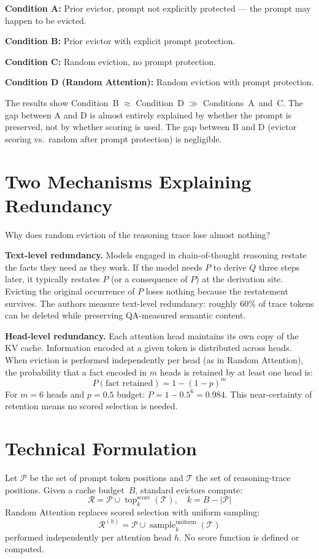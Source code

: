 \documentclass[10pt,twocolumn]{article}
\begin{document}
\textbf{Condition A:} Prior evictor, prompt not explicitly protected
--- the prompt may happen to be evicted.

\textbf{Condition B:} Prior evictor with explicit prompt protection.

\textbf{Condition C:} Random eviction, no prompt protection.

\textbf{Condition D (Random Attention):} Random eviction with prompt
protection.

The results show Condition~B $\approx$ Condition~D $\gg$
Conditions~A~and~C. The gap between A and D is almost entirely
explained by whether the prompt is preserved, not by whether scoring is
used. The gap between B and D (evictor scoring vs.\ random after prompt
protection) is negligible.

\section{Two Mechanisms Explaining Redundancy}

Why does random eviction of the reasoning trace lose almost nothing?

\textbf{Text-level redundancy.} Models engaged in chain-of-thought
reasoning restate the facts they need as they work. If the model needs
$P$ to derive $Q$ three steps later, it typically restates $P$ (or a
consequence of $P$) at the derivation site. Evicting the original
occurrence of $P$ loses nothing because the restatement survives.
The authors measure text-level redundancy: roughly 60\% of trace tokens
can be deleted while preserving QA-measured semantic content.

\textbf{Head-level redundancy.} Each attention head maintains its own
copy of the KV cache. Information encoded at a given token is
distributed across heads. When eviction is performed independently per
head (as in Random Attention), the probability that a fact encoded in
$m$ heads is retained by at least one head is:
\[
  P(\text{fact retained}) = 1 - (1-p)^m
\]
For $m = 6$ heads and $p = 0.5$ budget: $P = 1 - 0.5^6 = 0.984$.
This near-certainty of retention means no scored selection is needed.

\section{Technical Formulation}

Let $\mathcal{P}$ be the set of prompt token positions and
$\mathcal{T}$ the set of reasoning-trace positions. Given a cache
budget~$B$, standard evictors compute:
\[
  \mathcal{R} = \mathcal{P} \cup \operatorname{top}_k^{\!\text{score}}(\mathcal{T}),
  \quad k = B - |\mathcal{P}|
\]
Random Attention replaces scored selection with uniform sampling:
\[
  \mathcal{R}^{(h)} = \mathcal{P} \cup
  \operatorname{sample}_k^{\!\text{uniform}}(\mathcal{T})
\]
performed independently per attention head $h$. No score function is
defined or computed.
\end{document}
